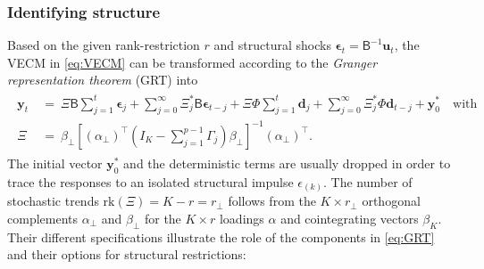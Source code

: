 \subsubsection{Identifying structure}
Based on the given rank-restriction $ r $ and structural shocks $ \boldsymbol{\epsilon}_{t} = \mathsf{B}^{-1} \boldsymbol{u}_{t} $, the VECM in \eqref{eq:VECM} can be transformed according to the \textit{Granger representation theorem} (GRT) into
\begin{align} \label{eq:GRT}
\begin{split}
	\boldsymbol{y}_{t} \ & = \ \Xi \mathsf{B} \sum_{j=1}^{t} \boldsymbol{\epsilon}_{j} + \sum_{j=0}^{\infty} \Xi^{*}_{j} \mathsf{B} \boldsymbol{\epsilon}_{t-j} + \Xi \Phi \sum_{j=1}^{t} \boldsymbol{d}_{j} + \sum_{j=0}^{\infty} \Xi^{*}_{j} \Phi \boldsymbol{d}_{t-j} + \boldsymbol{y}^{*}_{0} \quad \text{with} \\
	\Xi \ & = \ \beta_{\perp} \left[ \left( \alpha_{\perp} \right)^\top \left(I_K - \sum_{j=1}^{p-1} \Gamma_{j} \right) \beta_{\perp} \right]^{-1} \left( \alpha_{\perp} \right)^\top.
\end{split}
\end{align}
The initial vector $ \boldsymbol{y}^{*}_{0} $ and the deterministic terms are usually dropped in order to trace the responses to an isolated structural impulse $ \epsilon_{(k)} $. The number of stochastic trends $\text{rk}(\Xi) = K-r = r_\perp $ follows from the $ K \times r_\perp $ orthogonal complements $ \alpha_{\perp} $ and $ \beta_{\perp} $ for the $ K \times r $ loadings $ \alpha $ and cointegrating vectors $ \beta_K $. Their different specifications illustrate the role of the components in \eqref{eq:GRT} and their options for structural restrictions:
